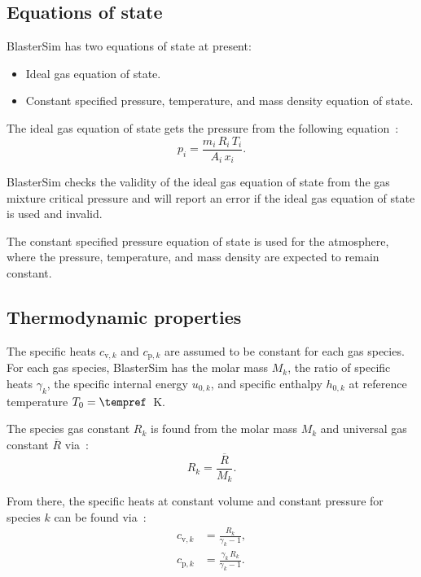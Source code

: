 \subsection{Equations of state}\label{equations-of-state}

BlasterSim has two equations of state at present:
\begin{itemize}
\item Ideal gas equation of state.
\item Constant specified pressure, temperature, and mass density equation of state.
\end{itemize}

The ideal gas equation of state gets the pressure from the following equation~\citep[eq.~3.33, p.~115]{moran_fundamentals_2008}:
\begin{equation}
    p_i = \frac{m_i \, R_i \, T_i}{A_i \, x_i}.\label{eq:ideal gas eos}
\end{equation}

BlasterSim checks the validity of the ideal gas equation of state from the gas mixture critical pressure and will report an error if the ideal gas equation of state is used and invalid.

The constant specified pressure equation of state is used for the atmosphere, where the pressure, temperature, and mass density are expected to remain constant.

\subsection{Thermodynamic properties}\label{thermo}

The specific heats $c_{\text{v},k}$ and $c_{\text{p},k}$ are assumed to be constant for each gas species.
For each gas species, BlasterSim has the molar mass $M_k$, the ratio of specific heats $\gamma_k$, the specific internal energy $u_{0,k}$, and specific enthalpy $h_{0,k}$ at reference temperature $T_0 = \tempref$~K.

The species gas constant $R_k$ is found from the molar mass $M_k$ and universal gas constant $\overline{R}$ via~\citep[p.~119]{moran_fundamentals_2008}:
\begin{equation}
    R_k = \frac{\overline{R}}{M_k}.
\end{equation}

From there, the specific heats at constant volume and constant pressure for species $k$ can be found via~\citep[p.~119]{moran_fundamentals_2008}:
\begin{align}
    c_{\text{v},k} &= \frac{R_k}{\gamma_k - 1}, \\
    c_{\text{p},k} &= \frac{\gamma_k\,R_k}{\gamma_k - 1}.
\end{align}

